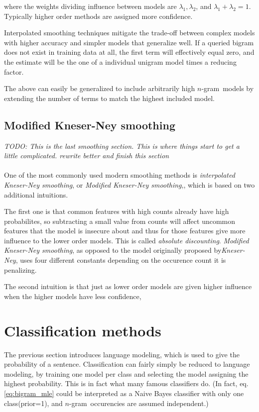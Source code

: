 \documentclass[a4paper,11pt]{kth-mag}
\newcommand{\ngram}{$n$-gram}
\begin{document}
where the weights dividing influence between models are $\lambda_1, \lambda_2$, and $\lambda_1 + \lambda_2 = 1$. Typically higher order methods are assigned more confidence.

Interpolated smoothing techniques mitigate the trade-off between complex models with higher accuracy and simpler models that generalize well. If a queried bigram does not exist in training data at all, the first term will effectively equal zero, and the estimate will be the one of a individual unigram model times a reducing factor.

The above can easily be generalized to include arbitrarily high \ngram~models by extending the number of terms to match the highest included model.

\subsection{Modified Kneser-Ney smoothing}
\emph{TODO: This is the last smoothing section. This is where things start to get a little complicated. rewrite better and finish this section}
\\
\\
One of the most commonly used modern smoothing methods is \emph{interpolated Kneser-Ney smoothing}, or \emph{Modified Kneser-Ney smoothing},\cite{nlp_book}, which is based on two additional intuitions.


The first one is that common features with high counts already have high probabilites, so subtracting a small value from counts will affect uncommon features that the model is insecure about and thus for those features give more influence to the lower order models. This is called \emph{absolute discounting}\cite{npl_book}. \emph{Modified Kneser-Ney smoothing}, as opposed to the model originally proposed by\emph{Kneser-Ney}, uses four different constants depending on the occurence count it is penalizing.

The second intuition is that just as lower order models are given higher influence when the higher models have less confidence,

\section{Classification methods}
The previous section introduces language modeling, which is used to give the probability of a sentence. Classification can fairly simply be reduced to language modeling, by training one model per class and selecting the model assigning the highest probability. This is in fact what many famous classifiers do. (In fact, eq. \ref {eq:bigram_mle} could be interpreted as a Naive Bayes classifier with only one class(prior=1), and \ngram~occurencies are assumed independent.)
\end{document}
